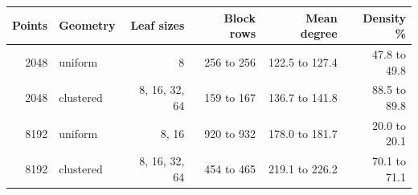 \begin{tabular}{rlrrrr}
\toprule
Points & Geometry & Leaf sizes & Block rows & Mean degree & Density \% \\
\midrule
2048 & uniform & 8 & 256 to 256 & 122.5 to 127.4 & 47.8 to 49.8 \\
2048 & clustered & 8, 16, 32, 64 & 159 to 167 & 136.7 to 141.8 & 88.5 to 89.8 \\
8192 & uniform & 8, 16 & 920 to 932 & 178.0 to 181.7 & 20.0 to 20.1 \\
8192 & clustered & 8, 16, 32, 64 & 454 to 465 & 219.1 to 226.2 & 70.1 to 71.1 \\
\bottomrule
\end{tabular}
